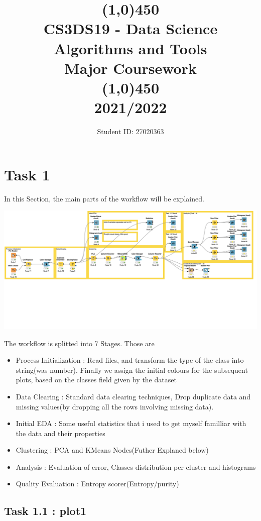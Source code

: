 \documentclass[12pt]{article}
\title{\line(1,0){450}\\ CS3DS19 - Data Science Algorithms and Tools \\ \large{Major Coursework }  \\\line(1,0){450} \\2021/2022}
\author{Student ID: 27020363}
\begin{document}
	\maketitle
	\pagebreak
	
	\section{Task 1}
		
		In this Section, the  main parts of the workflow will be explained.
		\begin{center}
			\includegraphics[scale=0.26]{res/workflow}
		\end{center}
		The workflow is splitted into 7 Stages. Those are
		\begin{itemize}
			\item Process Initialization : Read files, and transform the type of the class into string(was number). Finally we assign the initial colours for the subsequent plots, based on the classes field given by the dataset
			\item Data Clearing : Standard data clearing techniques, Drop duplicate data and missing values(by dropping all the rows involving missing data).
			\item Initial EDA : Some useful statistics that i used to get myself familliar with the data and their properties
			\item Clustering : PCA and KMeans Nodes(Futher Explaned below)
			\item Analysis : Evaluation of error, Classes distribution per cluster and histograms
			\item Quality Evaluation : Entropy scorer(Entropy/purity)
		\end{itemize}
	
	\subsection*{Task 1.1 : plot1}
	
\end{document}
